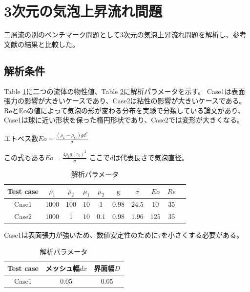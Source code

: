 \newpage
\section{3次元の気泡上昇流れ問題}

二層流の別のベンチマーク問題として3次元の気泡上昇流れ問題を解析し、参考文献の結果と比較した。

\subsection{解析条件}

Table \ref{table:3d-bubble-material-property}に二つの流体の物性値、Table \ref{table:3d-bubble-parameter}に解析パラメータを示す。
Case1は表面張力の影響が大きいケースであり、Case2は粘性の影響が大きいケースである。
ReとEoの値によって気泡の形が変わる分布を実験で分類している論文があり、Case1は球に近い形状を保った楕円形状であり、Case2では変形が大きくなる。

エトベス数$Eo = \frac{(\rho_L-\rho_G) g d^2}{\sigma}$

この式もある$Eo = \frac{4\rho_1 g (r_0)^2}{\sigma}$
ここで$d$は代表長さで気泡直径。

\renewcommand{\arraystretch}{1}
\begin{table}[H]
	\centering
	\caption{解析パラメータ}
	\begin{tabular}{cccccccccc}
		\hline
		Test case & $\rho_1$ & $\rho_2$ & $\mu_1$ & $\mu_2$ & $\mathrm{g}$ & $\sigma$ & $Eo$ & $Re$ \\
		\hline 
		Case$1$ & $1000$ & $100$ & $10$ & $1$   & $0.98$ & $24.5$ & $10$ & $35$\\
		Case$2$ & $1000$ & $1$   & $10$ & $0.1$ & $0.98$ & $1.96$ & $125$ & $35$\\ 
		\hline         
	\end{tabular}
	\label{table:3d-bubble-material-property}
\end{table}
\renewcommand{\arraystretch}{1.0}

Case1は表面張力が強いため、数値安定性のために$\tau$を小さくする必要がある。\cite{Yamaguchi2018}

\renewcommand{\arraystretch}{1}
\begin{table}[H]
	\centering
	\caption{解析パラメータ}
	\begin{tabular}{ccc}
		\hline
		Test case & メッシュ幅$dx$ & 界面幅$D$\\
		\hline 
		Case$1$ & $0.05$ & $0.05$\\
		\hline         
	\end{tabular}
	\label{table:3d-bubble-parameter}
\end{table}
\renewcommand{\arraystretch}{1.0}

